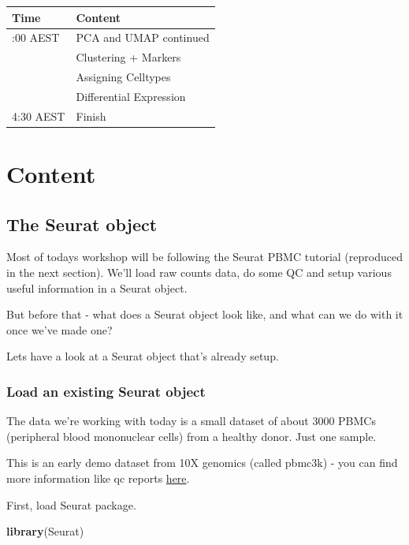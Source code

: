 \documentclass[
]{book}
\newenvironment{Shaded}{\begin{snugshade}}{\end{snugshade}}
\newcommand{\FunctionTok}[1]{\textcolor[rgb]{0.13,0.29,0.53}{\textbf{#1}}}
\newcommand{\NormalTok}[1]{#1}
\begin{document}
\begin{longtable}[]{@{}ll@{}}
\toprule\noalign{}
Time & Content \\
\midrule\noalign{}
\endhead
\bottomrule\noalign{}
\endlastfoot
1:00 AEST & PCA and UMAP continued \\
& Clustering + Markers \\
& Assigning Celltypes \\
& Differential Expression \\
4:30 AEST & Finish \\
\end{longtable}

\hypertarget{part-content}{%
\part{Content}\label{part-content}}

\hypertarget{seuratobject}{%
\chapter{The Seurat object}\label{seuratobject}}

Most of todays workshop will be following the Seurat PBMC tutorial (reproduced in the next section).
We'll load raw counts data, do some QC and setup various useful information in a Seurat object.

But before that - what does a Seurat object look like, and what can we do with it once we've made one?

Lets have a look at a Seurat object that's already setup.

\hypertarget{load-an-existing-seurat-object}{%
\section{Load an existing Seurat object}\label{load-an-existing-seurat-object}}

The data we're working with today is a small dataset of about 3000 PBMCs (peripheral blood mononuclear cells) from a healthy donor. Just one sample.

This is an early demo dataset from 10X genomics (called pbmc3k) - you can find more information like qc reports \href{https://www.10xgenomics.com/resources/datasets/3-k-pbm-cs-from-a-healthy-donor-1-standard-1-1-0}{here}.

First, load Seurat package.

\begin{Shaded}
\begin{Highlighting}[]
\FunctionTok{library}\NormalTok{(Seurat)}
\end{Highlighting}
\end{Shaded}
\end{document}
